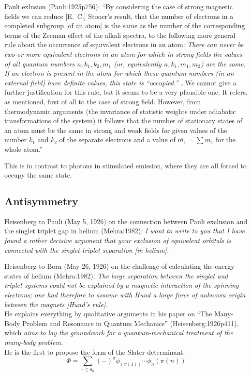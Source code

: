 Pauli exlusion (Pauli:1925p756):
``By considering the case of strong magnetic fields we can reduce [E.~C.]
Stoner's result, that the number of electrons in a completed subgroup [of an
atom] is the same as the number of the corresponding terms of the Zeeman effect
of the alkali spectra, to the following more general rule about the occurrence
of equivalent electrons in an atom:
{\itshape
    There can never be two or more equivalent electrons in an atom for which in
    strong fields the values of all quantum numbers \(n, k_1, k_2, m_1\) (or,
    equivalently \(n, k_1, m_1, m_2\)) are  the same.
    If an electron is present in the atom for which these quantum numbers (in an
    external field) have definite values, this state is ``occupied.''%
}
\dots We cannot give a further justification for this rule, but it seems to be a
very plausible one.
It refers, as mentioned, first of all to the case of strong field.
However, from thermodynamic arguments (the invariance of statistic weights under
adiabatic transformations of the system) it follows that the number of
stationary states of an atom must be the same in strong and weak fields for
given values of the number \(k_1\) and \(k_2\) of the separate electrons and a
value of \(\overline{m_1}=\sum m_1\) for the whole atom.''

This is in contrast to photons in stimulated emission, where they are all forced
to occupy the same state.

\subsection{Antisymmetry}

Heisenberg to Pauli (May 5, 1926) on the connection between Pauli exclusion and
the singlet triplet gap in helium (Mehra:1982):
{\itshape
    I want to write to you that I have found a rather decisive argument that
    your exclusion of equivalent orbitals is connected with the singlet-triplet
    separation [in helium].
}

Heisenberg to Born (May 26, 1926) on the challenge of calculating the energy
states of helium (Mehra:1982):
{\itshape
    The large separation between the singlet and triplet systems could not be
    explained by a magnetic interaction of the spinning electrons; one had
    therefore to assume with Hund a large force of unknown origin between the
    magnets [Hund's rule].
}
\\
He explains everything by qualitative arguments in his paper on ``The Many-Body
Problem and Resonance in Quantum Mechanics'' (Heisenberg:1926p411), which
{\itshape
    aims to lay the groundwork for a quantum-mechanical treatment of the
    many-body problem.
}
\\
He is the first to propose the form of the Slater determinant.
\begin{equation}
    \Phi
    =
    \sum_{\pi\in\mathrm{S}_n}
    (-)^\pi
    \phi_(\pi(1))
    \cdots
    \phi_n(\pi(n))
\end{equation}



